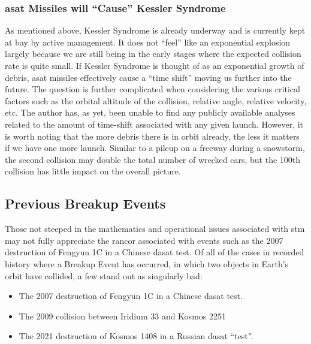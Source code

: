 \subsubsection{\ac{asat} Missiles will ``Cause'' Kessler Syndrome}
As mentioned above, Kessler Syndrome is already underway and is
currently kept at bay by active management.  It does not ``feel'' like
an exponential explosion largely because we are still being in the
early stages where the expected collision rate is quite small.  If
Kessler Syndrome is thought of as an exponential growth of debris,
\ac{asat} missiles effectively cause a ``time shift'' moving us
further into the future.  The question is further complicated when
considering the various critical factors such as the orbital altitude
of the collision, relative angle, relative velocity, etc.  The author
has, as yet, been unable to find any publicly available analyses
related to the amount of time-shift associated with any given launch.
However, it is worth noting that the more debris there is in orbit
already, the less it matters if we have one more launch.  Similar to a
pileup on a freeway during a snowstorm, the second collision may
double the total number of wrecked cars, but the 100th collision has
little impact on the overall picture.

\subsection{Previous Breakup Events}

Those not steeped in the mathematics and operational issues associated
with \ac{stm} may not fully appreciate the rancor associated with
events such as the 2007 destruction of Fengyun 1C in a Chinese
\ac{dasat} test.  Of all of the cases in recorded history where a
Breakup Event has occurred, in which two objects in Earth's orbit have
collided, a few stand out as singularly bad:

\begin{itemize}

\item The 2007 destruction of Fengyun 1C in a Chinese \ac{dasat} test.

\item The 2009 collision between Iridium 33 and Kosmos 2251

\item The 2021 destruction of Kosmos 1408 in a Russian \ac{dasat} ``test''.

\end{itemize}

